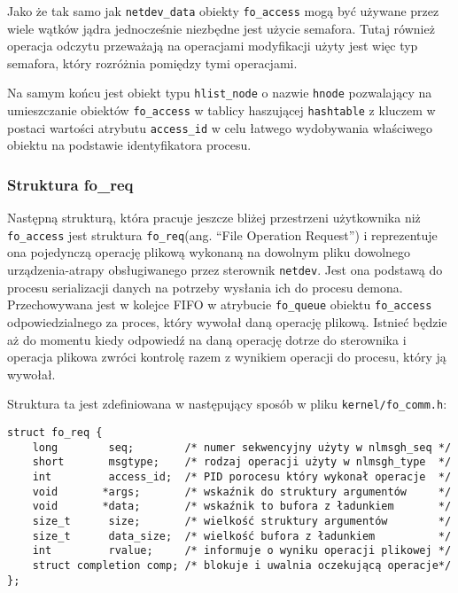 Jako że tak samo jak \texttt{netdev\_data} obiekty \texttt{fo\_access}
mogą być używane przez wiele wątków jądra jednocześnie niezbędne jest
użycie semafora. Tutaj również operacja odczytu przeważają na operacjami
modyfikacji użyty jest więc typ semafora, który rozróżnia pomiędzy tymi
operacjami.

Na samym końcu jest obiekt typu \texttt{hlist\_node} o nazwie
\texttt{hnode} pozwalający na umieszczanie obiektów \texttt{fo\_access}
w tablicy haszującej \texttt{hashtable} z kluczem w postaci wartości
atrybutu \texttt{access\_id} w celu łatwego wydobywania właściwego
obiektu na podstawie identyfikatora procesu.

\subsubsection{Struktura fo\_req}

Następną strukturą, która pracuje jeszcze bliżej przestrzeni użytkownika
niż \texttt{fo\_access} jest struktura \texttt{fo\_req}(ang. ``File
Operation Request'') i reprezentuje ona pojedynczą operację plikową
wykonaną na dowolnym pliku dowolnego urządzenia-atrapy obsługiwanego
przez sterownik \texttt{netdev}. Jest ona podstawą do procesu
serializacji danych na potrzeby wysłania ich do procesu demona.
Przechowywana jest w kolejce FIFO w atrybucie \texttt{fo\_queue} obiektu
\texttt{fo\_access} odpowiedzialnego za proces, który wywołał daną
operację plikową. Istnieć będzie aż do momentu kiedy odpowiedź na daną
operację dotrze do sterownika i operacja plikowa zwróci kontrolę razem z
wynikiem operacji do procesu, który ją wywołał.

Struktura ta jest zdefiniowana w następujący sposób w pliku
\texttt{kernel/fo\_comm.h}:

\begin{verbatim}
struct fo_req {
    long        seq;        /* numer sekwencyjny użyty w nlmsgh_seq */
    short       msgtype;    /* rodzaj operacji użyty w nlmsgh_type  */
    int         access_id;  /* PID porocesu który wykonał operacje  */
    void       *args;       /* wskaźnik do struktury argumentów     */
    void       *data;       /* wskaźnik to bufora z ładunkiem       */
    size_t      size;       /* wielkość struktury argumentów        */
    size_t      data_size;  /* wielkość bufora z ładunkiem          */
    int         rvalue;     /* informuje o wyniku operacji plikowej */
    struct completion comp; /* blokuje i uwalnia oczekującą operacje*/
};
\end{verbatim}

